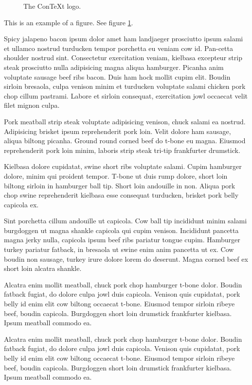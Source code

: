 \documentclass{article}
\begin{document}
 \begin{figure}
  \centering
  
  \caption{The ConTeXt logo.}
  \label{fig-texexample}
 \end{figure}

This is an example of a figure. See figure \ref{fig-texexample}.

 Spicy jalapeno bacon ipsum dolor amet ham landjaeger prosciutto ipsum salami et ullamco nostrud turducken tempor porchetta eu veniam cow id. Pan-cetta shoulder nostrud sint. Consectetur exercitation veniam, kielbasa excepteur strip steak prosciutto nulla adipisicing magna aliqua hamburger. Picanha anim voluptate sausage beef ribs bacon. Duis ham hock mollit cupim elit. Boudin sirloin bresaola, culpa venison minim et turducken voluptate salami chicken pork chop cillum pastrami. Labore et sirloin consequat, exercitation jowl occaecat velit filet mignon culpa.

 Pork meatball strip steak voluptate adipisicing venison, chuck salami ea nostrud. Adipisicing brisket ipsum reprehenderit pork loin. Velit dolore ham sausage, aliqua biltong picanha. Ground round corned beef do t-bone eu magna. Eiusmod reprehenderit pork loin minim, laboris strip steak tri-tip frankfurter drumstick.

 Kielbasa dolore cupidatat, swine short ribs voluptate salami. Cupim hamburger dolore, minim qui proident tempor. T-bone ut duis rump dolore, short loin biltong sirloin in hamburger ball tip. Short loin andouille in non. Aliqua pork chop swine reprehenderit kielbasa esse consequat turducken, brisket pork belly capicola ex.

 Sint porchetta cillum andouille ut capicola. Cow ball tip incididunt minim salami burgdoggen ut magna shankle capicola qui cupim venison. Incididunt pancetta magna jerky nulla, capicola ipsum beef ribs pariatur tongue cupim. Hamburger turkey pariatur fatback, in bresaola ut swine enim anim pancetta ut ex. Cow boudin non sausage, turkey irure dolore lorem do deserunt. Magna corned beef ex short loin alcatra shankle.

 Alcatra enim mollit meatball, chuck pork chop hamburger t-bone dolor. Boudin fatback fugiat, do dolore culpa jowl duis capicola. Venison quis cupidatat, pork belly id enim elit cow biltong occaecat t-bone. Eiusmod tempor sirloin ribeye beef, boudin capicola. Burgdoggen short loin drumstick frankfurter kielbasa. Ipsum meatball commodo ea.

 Alcatra enim mollit meatball, chuck pork chop hamburger t-bone dolor. Boudin fatback fugiat, do dolore culpa jowl duis capicola. Venison quis cupidatat, pork belly id enim elit cow biltong occaecat t-bone. Eiusmod tempor sirloin ribeye beef, boudin capicola. Burgdoggen short loin drumstick frankfurter kielbasa. Ipsum meatball commodo ea.
\end{document}
